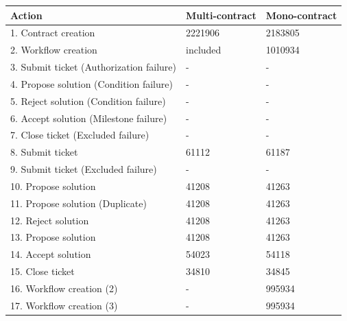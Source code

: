 \documentclass{article}
\begin{document}
		\begin{tabular}{| l | l | l |}
			\hline
			Action 										& Multi-contract & Mono-contract \\ \hline
			1. Contract creation						& 2221906		 & 2183805 	\\\hline
			2. Workflow creation						& included 		 & 1010934 	\\\hline
			3. Submit ticket (Authorization failure)	& -				 & - 		\\\hline
			4. Propose solution (Condition failure)		& -				 & - 		\\\hline
			5. Reject solution (Condition failure)		& -				 & - 		\\\hline
			6. Accept solution (Milestone failure)		& -				 & - 		\\\hline
			7. Close ticket (Excluded failure)			& -				 & - 		\\\hline
			8. Submit ticket							& 61112			 & 61187 	\\\hline
			9. Submit ticket (Excluded failure)			& -				 & - 		\\\hline
			10. Propose solution						& 41208			 & 41263 	\\\hline
			11. Propose solution (Duplicate)			& 41208			 & 41263 	\\\hline
			12. Reject solution							& 41208			 & 41263 	\\\hline
			13. Propose solution						& 41208			 & 41263 	\\\hline
			14. Accept solution							& 54023			 & 54118 	\\\hline
			15. Close ticket							& 34810			 & 34845 	\\\hline
			16. Workflow creation (2)					& -				 & 995934 	\\\hline
			17. Workflow creation (3)					& -				 & 995934 	\\\hline
			\hline
		\end{tabular}
\end{document}
